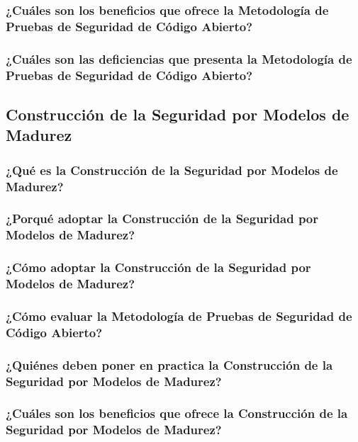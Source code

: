 \documentclass[runningheads,a4paper]{llncs}
\begin{document}
\subsubsection{¿Cuáles son los beneficios que ofrece la Metodología de Pruebas de Seguridad de Código Abierto?}

\subsubsection{¿Cuáles son las deficiencias que presenta la Metodología de Pruebas de Seguridad de Código Abierto?}


\subsection{Construcción de la Seguridad por Modelos de Madurez}

\subsubsection{¿Qué es la Construcción de la Seguridad por Modelos de Madurez?}

\subsubsection{¿Porqué adoptar la Construcción de la Seguridad por Modelos de Madurez?}

\subsubsection{¿Cómo adoptar la Construcción de la Seguridad por Modelos de Madurez?}

\subsubsection{¿Cómo evaluar la Metodología de Pruebas de Seguridad de Código Abierto?}

\subsubsection{¿Quiénes deben poner en practica la Construcción de la Seguridad por Modelos de Madurez?}

\subsubsection{¿Cuáles son los beneficios que ofrece la Construcción de la Seguridad por Modelos de Madurez?}
\end{document}
